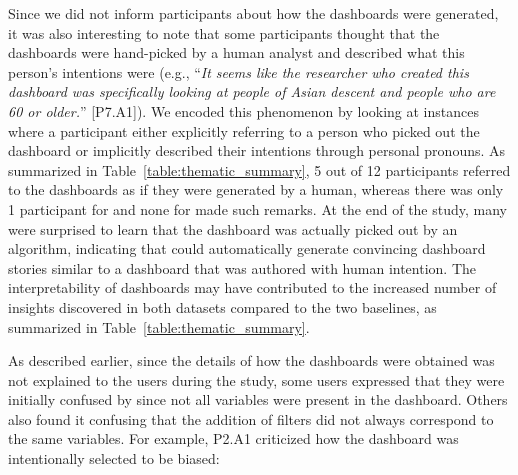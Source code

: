 \par Since we did not inform participants about how the dashboards were generated, it was also interesting to note that some participants thought that the dashboards were hand-picked by a human analyst and described what this person's intentions were (e.g., ``\textit{It seems like the researcher who created this dashboard was specifically looking at people of Asian descent and people who are 60 or older.}'' [P7.A1]). We encoded this phenomenon by looking at instances where a participant either explicitly referring to a person who picked out the dashboard or implicitly described their intentions through personal pronouns. As summarized in Table~\ref{table:thematic_summary}, 5 out of 12 participants referred to the \system dashboards as if they were generated by a human, whereas there was only 1 participant for \cluster and none for \BFS made such remarks. At the end of the study, many were surprised to learn that the \system dashboard was actually picked out by an algorithm, indicating that \system could automatically generate convincing dashboard stories similar to a dashboard that was authored with human intention. The interpretability of \system dashboards may have contributed to the increased number of insights discovered in both datasets compared to the two baselines, as summarized in Table~\ref{table:thematic_summary}.
\par As described earlier, since the details of how the dashboards were obtained was not explained to the users during the study, some users expressed that they were initially confused by \system since not all variables were present in the dashboard. Others also found it confusing that the addition of filters did not always correspond to the same variables. For example, P2.A1 criticized how the dashboard was intentionally selected to be biased:
